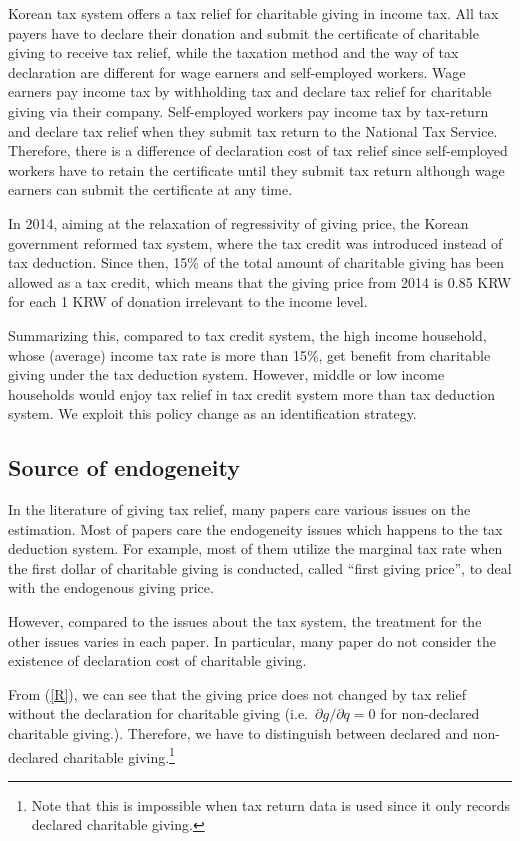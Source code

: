 \documentclass[
  11pt,
  a4paper,
]{article}
\begin{document}
Korean tax system offers a tax relief for charitable giving in income tax. All tax payers have to declare their donation and submit the certificate of charitable giving to receive tax relief, while the taxation method and the way of tax declaration are different for wage earners and self-employed workers. Wage earners pay income tax by withholding tax and declare tax relief for charitable giving via their company. Self-employed workers pay income tax by tax-return and declare tax relief when they submit tax return to the National Tax Service. Therefore, there is a difference of declaration cost of tax relief since self-employed workers have to retain the certificate until they submit tax return although wage earners can submit the certificate at any time.

In 2014, aiming at the relaxation of regressivity of giving price, the Korean government reformed tax system, where the tax credit was introduced instead of tax deduction. Since then, 15\% of the total amount of charitable giving has been allowed as a tax credit, which means that the giving price from 2014 is 0.85 KRW for each 1 KRW of donation irrelevant to the income level.

Summarizing this, compared to tax credit system, the high income household, whose (average) income tax rate is more than 15\%, get benefit from charitable giving under the tax deduction system. However, middle or low income households would enjoy tax relief in tax credit system more than tax deduction system. We exploit this policy change as an identification strategy.

\hypertarget{source-of-endogeneity}{%
\subsection{Source of endogeneity}\label{source-of-endogeneity}}

In the literature of giving tax relief, many papers care various issues on the estimation. Most of papers care the endogeneity issues which happens to the tax deduction system. For example, most of them utilize the marginal tax rate when the first dollar of charitable giving is conducted, called ``first giving price'', to deal with the endogenous giving price.

However, compared to the issues about the tax system, the treatment for the other issues varies in each paper. In particular, many paper do not consider the existence of declaration cost of charitable giving.

From (\ref{R}), we can see that the giving price does not changed by tax relief without the declaration for charitable giving (i.e.~\(\partial g/\partial q=0\) for non-declared charitable giving.). Therefore, we have to distinguish between declared and non-declared charitable giving.\footnote{Note that this is impossible when tax return data is used since it only records declared charitable giving.}
\end{document}
